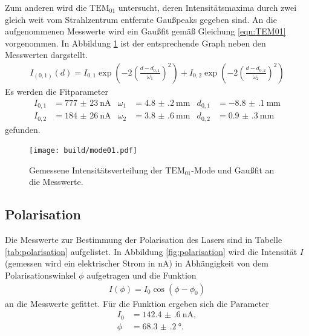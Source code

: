 Zum anderen wird die \textbf{$\text{TEM}_{01}$} untersucht, deren Intensitätsmaxima durch
zwei gleich weit vom Strahlzentrum entfernte Gaußpeaks gegeben sind.
An die aufgenommenen Messwerte wird ein Gaußfit gemäß Gleichung \ref{eqn:TEM01} vorgenommen.
In Abbildung \ref{fig:mode01} ist der entsprechende Graph neben den Messwerten dargstellt.
\begin{align}
  I_{(0,1)}(d)=I_{0,1}\exp\left(-2\left(\frac{d-d_{0,1}}{\omega_1}\right)^2\right)+I_{0,2}\exp\left(-2\left(\frac{d-d_{0,2}}{\omega_2}\right)^2\right) \label{eqn:TEM01}
\end{align}
Es werden die Fitparameter
 \begin{align}
   I_{0,1}&=\SI{777(23)}{\nano\ampere}& \omega_{1}&=\SI{4.8(2)}{\milli\meter} &   d_{0,1}&=\SI{-8.8(1)}{\milli\meter}\\
   I_{0,2}&=\SI{184(26)}{\nano\ampere}& \omega_{2}&=\SI{3.8(6)}{\milli\meter} &   d_{0,2}&=\SI{0.9(3)}{\milli\meter}
 \end{align}
gefunden.
\begin{figure}
  \centering
  \texttt{[image: build/mode01.pdf]}
  \caption{Gemessene Intensitätsverteilung der \textbf{$\text{TEM}_{01}$}-Mode und Gaußfit an die Messwerte.}
  \label{fig:mode01}
\end{figure}



\subsection{Polarisation}
\label{subsec:Polarisation}
Die Messwerte zur Bestimmung der Polarisation des Lasers sind in Tabelle \ref{tab:polarisation} aufgelistet.
In Abbildung \ref{fig:polarisation} wird die Intensität $I$(gemessen wird ein elektrischer Strom in $\si{\nano\ampere}$)
in Abhängigkeit von dem Polarisationswinkel $\phi$
aufgetragen und die Funktion
\begin{align}
I(\phi)=I_0 \cos\left(\phi-\phi_0\right)
\end{align}
an die Messwerte gefittet.
Für die Funktion ergeben sich die Parameter
\begin{align}
I_0  & = \SI{142.4(6)}{\nano\ampere},\\
\phi & = \SI{68.3(2)}{\degree}.
\end{align}

